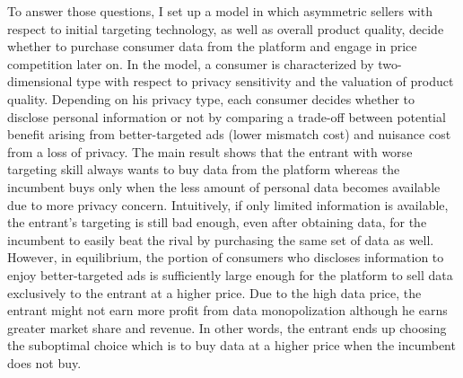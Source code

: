 \documentclass[12pt]{article}
\begin{document}
To answer those questions, I set up a model in which asymmetric sellers with respect to initial targeting technology, as well as overall product quality, decide whether to purchase consumer data from the platform and engage in price competition later on. In the model, a consumer is characterized by two-dimensional type with respect to privacy sensitivity and the valuation of product quality. Depending on his privacy type, each consumer decides whether to disclose personal information or not by comparing a trade-off between potential benefit arising from better-targeted ads (lower mismatch cost) and nuisance cost from a loss of privacy. The main result shows that the entrant with worse targeting skill always wants to buy data from the platform whereas the incumbent buys only when the less amount of personal data becomes available due to more privacy concern. Intuitively, if only limited information is available, the entrant's targeting is still bad enough, even after obtaining data, for the incumbent to easily beat the rival by purchasing the same set of data as well. However, in equilibrium, the portion of consumers who discloses information to enjoy better-targeted ads is sufficiently large enough for the platform to sell data exclusively to the entrant at a higher price. Due to the high data price, the entrant might not earn more profit from data monopolization although he earns greater market share and revenue. In other words, the entrant ends up choosing the suboptimal choice which is to buy data at a higher price when the incumbent does not buy. 
\end{document}
